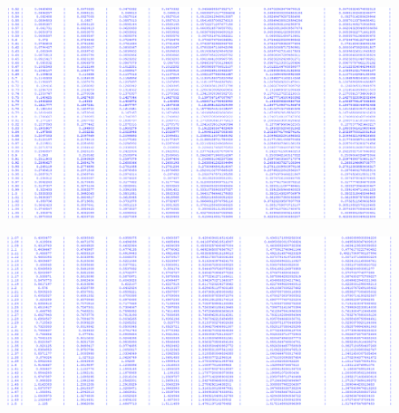 \documentclass[12pt,a4paper]{scrartcl}
\begin{document}
	\begin{figure}[H]
		\centering
		\includegraphics[width=\linewidth]{2}
		\caption{}
		\label{fig:2}
	\end{figure}

	\begin{figure}[H]
		\centering
		\includegraphics[width=\linewidth]{3}
		\caption{}
		\label{fig:3}
	\end{figure}
	
\end{document}
